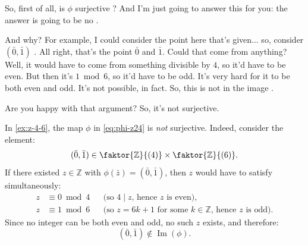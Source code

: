 \begin{content}

\end{content}

\begin{speech}[00:03:41 - 00:04:33]
So, first of all, is $\phi$ surjective ? And I'm just going to answer this for you: the answer is going to be no .

And why? For example, I could consider the point here that's given... so, consider $(\bar{0}, \bar{1})$ . All right, that's the point $\bar{0}$ and $\bar{1}$. Could that come from anything? Well, it would have to come from something divisible by $4$, so it'd have to be even. But then it's $1 \bmod 6$, so it'd have to be odd. It's very hard for it to be both even and odd. It's not possible, in fact. So, this is not in the image .

Are you happy with that argument? So, it's not surjective.
\end{speech}

\begin{content}
In \cref{ex:z-4-6}, the map $\phi$ in \eqref{eq:phi-z24} is \emph{not} surjective. Indeed, consider the element:
\[
(\bar{0}, \bar{1}) \in \faktor{\mathbb{Z}}{(4)} \times \faktor{\mathbb{Z}}{(6)}.
\]
If there existed $z \in \mathbb{Z}$ with $\phi(\bar{z}) = (\bar{0}, \bar{1})$, then $z$ would have to satisfy simultaneously:
\begin{align*}
z &\equiv 0 \bmod 4 && \text{(so $4 \mid z$, hence $z$ is even),} \\
z &\equiv 1 \bmod 6 && \text{(so $z = 6k + 1$ for some $k \in \mathbb{Z}$, hence $z$ is odd).}
\end{align*}
Since no integer can be both even and odd, no such $z$ exists, and therefore:
\[
(\bar{0}, \bar{1}) \notin \operatorname{Im}(\phi).
\]
\end{content}

